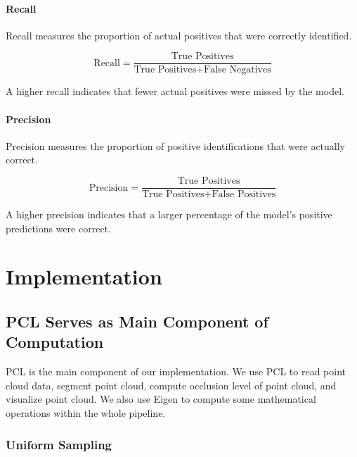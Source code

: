 \documentclass[11pt, a4paper,oneside,chapterprefix=false]{scrbook}
\begin{document}
\subsubsection{Recall}

Recall measures the proportion of actual positives that were correctly identified.

\begin{equation}
	\text{Recall} = \frac{\text{True Positives}}{\text{True Positives} + \text{False Negatives}}
\end{equation}

A higher recall indicates that fewer actual positives were missed by the model.

\subsubsection{Precision}

Precision measures the proportion of positive identifications that were actually correct.

\begin{equation}
	\text{Precision} = \frac{\text{True Positives}}{\text{True Positives} + \text{False Positives}}
\end{equation}

A higher precision indicates that a larger percentage of the model's positive predictions were correct.

\chapter{Implementation} \label{chp:implementation}


\section{PCL Serves as Main Component of Computation} \label{sec:pcl and eigen}

PCL is the main component of our implementation. We use PCL to read point cloud data, segment point cloud, compute occlusion level of point cloud, and visualize point cloud. We also use Eigen to compute some mathematical operations within the whole pipeline.

\subsection{Uniform Sampling} \label{subsec:uniform sampling}
\end{document}
